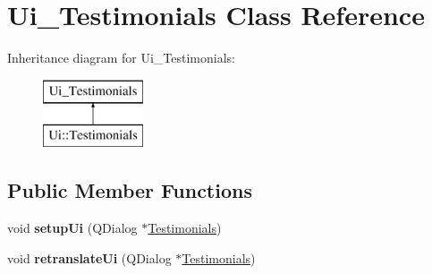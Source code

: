 \hypertarget{class_ui___testimonials}{}\section{Ui\+\_\+\+Testimonials Class Reference}
\label{class_ui___testimonials}
Inheritance diagram for Ui\+\_\+\+Testimonials\+:\begin{figure}[H]
\begin{center}
\leavevmode
\includegraphics[height=2.000000cm]{class_ui___testimonials}
\end{center}
\end{figure}
\subsection*{Public Member Functions}
\begin{DoxyCompactItemize}
\item 
\mbox{\label{class_ui___testimonials_a5318933ddce45cf803fce20c7931528b}} 
void {\bfseries setup\+Ui} (Q\+Dialog $\ast$\hyperlink{class_testimonials}{Testimonials})
\item 
\mbox{\label{class_ui___testimonials_a3d78b15bd8d7baf11793bdfcef983264}} 
void {\bfseries retranslate\+Ui} (Q\+Dialog $\ast$\hyperlink{class_testimonials}{Testimonials})
\end{DoxyCompactItemize}
